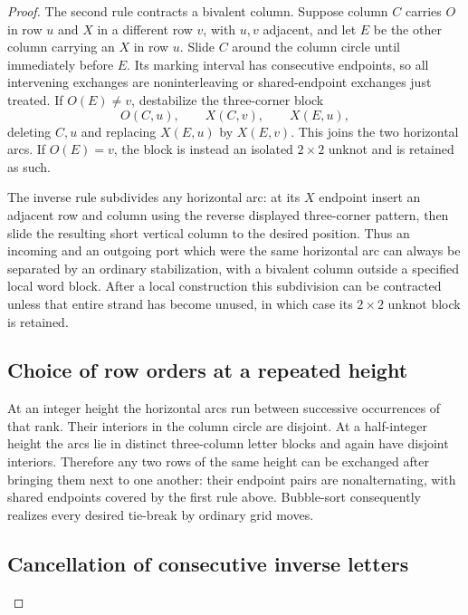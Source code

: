 \documentclass[11pt,a4paper]{article}
\theoremstyle{remark}
\begin{document}
\begin{proof}
The second rule contracts a bivalent column.  Suppose column $C$ carries
$O$ in row $u$ and $X$ in a different row $v$, with $u,v$ adjacent, and
let $E$ be the other column carrying an $X$ in row $u$.  Slide $C$
around the column circle until immediately before $E$.  Its marking
interval has consecutive endpoints, so all intervening exchanges are
noninterleaving or shared-endpoint exchanges just treated.  If
$O(E)\ne v$, destabilize the three-corner block
\[
 O(C,u),\qquad X(C,v),\qquad X(E,u),
\]
deleting $C,u$ and replacing $X(E,u)$ by $X(E,v)$.  This joins the two
horizontal arcs.  If $O(E)=v$, the block is instead an isolated $2\times2$
unknot and is retained as such.

The inverse rule subdivides any horizontal arc: at its $X$ endpoint
insert an adjacent row and column using the reverse displayed
three-corner pattern, then slide the resulting short vertical column to
the desired position.  Thus an incoming and an outgoing port which were
the same horizontal arc can always be separated by an ordinary
stabilization, with a bivalent column outside a specified local word
block.  After a local construction this subdivision can be contracted
unless that entire strand has become unused, in which case its
$2\times2$ unknot block is retained.

\subsection{Choice of row orders at a repeated height}

At an integer height the horizontal arcs run between successive
occurrences of that rank.  Their interiors in the column circle are
disjoint.  At a half-integer height the arcs lie in distinct three-column
letter blocks and again have disjoint interiors.  Therefore any two
rows of the same height can be exchanged after bringing them next to
one another: their endpoint pairs are nonalternating, with shared
endpoints covered by the first rule above.  Bubble-sort consequently
realizes every desired tie-break by ordinary grid moves.

\subsection{Cancellation of consecutive inverse letters}


\end{proof}
\end{document}
